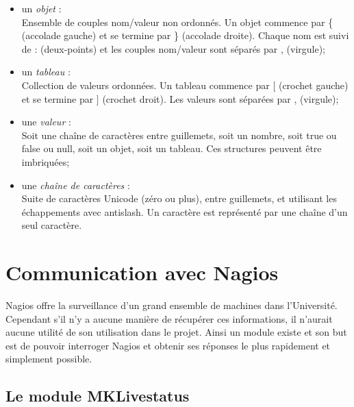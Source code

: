\begin{itemize}
	\item un \textit{objet} :\\Ensemble de couples nom/valeur non ordonn\'es. Un objet commence par \textsf{\{ (accolade gauche)} et se termine par \textsf{\} (accolade droite)}.
	Chaque nom est suivi de \textsf{: (deux-points)} et les couples nom/valeur sont s\'epar\'es par \textsf{, (virgule)};
	\item un \textit{tableau} :\\Collection de valeurs ordonn\'ees. Un tableau commence par \textsf{$[$ (crochet gauche)} et se termine par \textsf{$]$ (crochet droit)}.
	Les valeurs sont s\'epar\'ees par \textsf{, (virgule)};
	\item une \textit{valeur} :\\Soit une \textsf{cha\^ine de caract\`eres} entre guillemets, soit un \textsf{nombre}, soit \textsf{true} ou \textsf{false} ou \textsf{null}, soit un \textsf{objet}, soit un \textsf{tableau}.
	Ces structures peuvent \^etre imbriqu\'ees;
	\item une \textit{cha\^ine de caract\`eres} :\\Suite de caract\`eres Unicode (z\'ero ou plus), entre guillemets, et utilisant les \'echappements avec antislash. 
	Un caract\`ere est repr\'esent\'e par une cha\^ine d'un seul caract\`ere.

\end{itemize}



\section{Communication avec Nagios}

Nagios offre la surveillance d'un grand ensemble de machines dans l'Universit\'e. 
Cependant s'il n'y a aucune mani\`ere de r\'ecup\'erer ces informations, il n'aurait aucune utilit\'e de son utilisation dans le projet.
Ainsi un module existe et son but est de pouvoir interroger Nagios et obtenir ses r\'eponses le plus rapidement et simplement possible.

\subsection{Le module MKLivestatus}
\label{section:moduleMKLivestatus}

